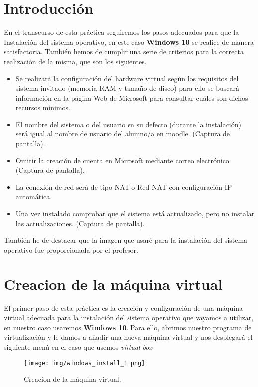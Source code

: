 \documentclass[12pt]{article}
\begin{document}
    \section*{Introducción}
      En el transcurso de esta práctica seguiremos los pasos adecuados para que la Instalación del sistema 
      operativo, en este caso \textbf{Windows 10} se realice de manera satisfactoria. También hemos de cumplir 
      una serie de criterios para la correcta realización de la misma, que son los siguientes.
      \begin{itemize}
        \item Se realizará la configuración del hardware virtual según los requisitos del sistema invitado 
        (memoria RAM y tamaño de disco) para ello se buscará información en la página Web de Microsoft 
        para consultar cuáles son dichos recursos mínimos.
        \item  El nombre del sistema o del usuario en su defecto (durante la instalación) será igual al nombre 
        de usuario del alumno/a en moodle. (Captura de pantalla).
        \item Omitir la creación de cuenta en Microsoft mediante correo electrónico (Captura de pantalla).
        \item La conexión de red será de tipo NAT o Red NAT con configuración IP automática.
        \item Una vez instalado comprobar que el sistema está actualizado, pero no instalar las actualizaciones. 
        (Captura de pantalla).
      \end{itemize}
      También he de destacar que la imagen que usaré para la instalación del sistema operativo fue proporcionada por el 
      profesor.

    \newpage
    
    \section{Creacion de la máquina virtual}
      El primer paso de esta práctica es la creación y configuración de una máquina virtual adecuada para la instalación 
      del sistema operativo que vayamos a utilizar, en nuestro caso usaremos \textbf{Windows 10}. Para ello, abrimos 
      nuestro programa de virtualización y le damos a añadir una nueva máquina virtual y nos desplegará el siguiente menú
      en el caso que usemos \textit{virtual box}
      \begin{figure}[h]
        \centering
        \texttt{[image: img/windows\_install\_1.png]}
        \caption{Creacion de la máquina virtual.}
        \label{Windows1}
      \end{figure}
\end{document}
